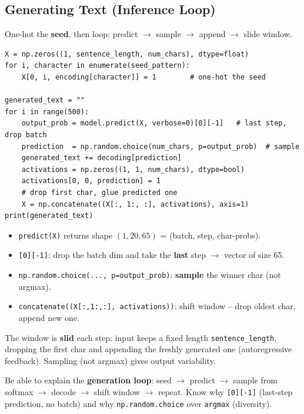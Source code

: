 \documentclass[10pt,a4paper]{article}
\begin{document}
	\subsection{Generating Text (Inference Loop)}

	One-hot the \textbf{seed}, then loop: predict $\rightarrow$ sample $\rightarrow$ append $\rightarrow$ slide window.

	\begin{verbatim}
X = np.zeros((1, sentence_length, num_chars), dtype=float)
for i, character in enumerate(seed_pattern):
    X[0, i, encoding[character]] = 1        # one-hot the seed

generated_text = ""
for i in range(500):
    output_prob = model.predict(X, verbose=0)[0][-1]   # last step, drop batch
    prediction  = np.random.choice(num_chars, p=output_prob)  # sample
    generated_text += decoding[prediction]
    activations = np.zeros((1, 1, num_chars), dtype=bool)
    activations[0, 0, prediction] = 1
    # drop first char, glue predicted one
    X = np.concatenate((X[:, 1:, :], activations), axis=1)
print(generated_text)
	\end{verbatim}

	\begin{itemize}[leftmargin=*]
		\item \texttt{predict(X)} returns shape $(1, 20, 65)$ = (batch, step, char-probs).
		\item \texttt{[0][-1]}: drop the batch dim and take the \textbf{last} step $\rightarrow$ vector of size 65.
		\item \texttt{np.random.choice(..., p=output\_prob)}: \textbf{sample} the winner char (not argmax).
		\item \texttt{concatenate((X[:,1:,:], activations))}: shift window -- drop oldest char, append new one.
	\end{itemize}

	\begin{importantbox}
		The window is \textbf{slid} each step: input keeps a fixed length \texttt{sentence\_length}, dropping the first char and appending the freshly generated one (autoregressive feedback). Sampling (not argmax) gives output variability.
	\end{importantbox}

	\begin{examtipbox}
		Be able to explain the \textbf{generation loop}: seed $\rightarrow$ predict $\rightarrow$ sample from softmax $\rightarrow$ decode $\rightarrow$ shift window $\rightarrow$ repeat. Know why \texttt{[0][-1]} (last-step prediction, no batch) and why \texttt{np.random.choice} over \texttt{argmax} (diversity).
	\end{examtipbox}
\end{document}
